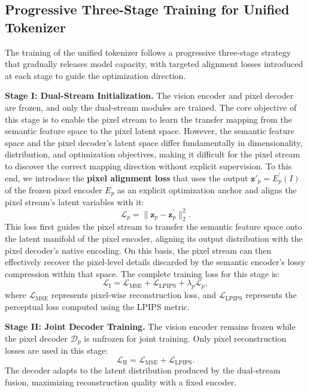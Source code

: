 \documentclass[runningheads]{llncs}
\begin{document}
\subsection{Progressive Three-Stage Training for Unified Tokenizer}

The training of the unified tokenizer follows a progressive three-stage strategy that gradually releases model capacity, with targeted alignment losses introduced at each stage to guide the optimization direction.

\noindent\textbf{Stage I: Dual-Stream Initialization.}
The vision encoder and pixel decoder are frozen, and only the dual-stream modules are trained. The core objective of this stage is to enable the pixel stream to learn the transfer mapping from the semantic feature space to the pixel latent space. However, the semantic feature space and the pixel decoder's latent space differ fundamentally in dimensionality, distribution, and optimization objectives, making it difficult for the pixel stream to discover the correct mapping direction without explicit supervision. To this end, we introduce the \textbf{pixel alignment loss} that uses the output $\mathbf{z}'_p = E^{'}_p(I)$ of the frozen pixel encoder $E_p$ as an explicit optimization anchor and aligns the pixel stream's latent variables with it:
$$\mathcal{L}_{p} = \| \mathbf{z}_{p} - \mathbf{z}_p^{'} \|_2^2.$$
This loss first guides the pixel stream to transfer the semantic feature space onto the latent manifold of the pixel encoder, aligning its output distribution with the pixel decoder's native encoding. On this basis, the pixel stream can then effectively recover the pixel-level details discarded by the semantic encoder's lossy compression within that space. The complete training loss for this stage is:
$$\mathcal{L}_{\text{I}} = \mathcal{L}_{\text{MSE}} + \mathcal{L}_{\text{LPIPS}} + \lambda_p \mathcal{L}_{p},$$
where $\mathcal{L}_{\text{MSE}}$ represents pixel-wise reconstruction loss, and $\mathcal{L}_{\text{LPIPS}}$ represents the perceptual loss
computed using the LPIPS metric.

\noindent\textbf{Stage II: Joint Decoder Training.} The vision encoder remains frozen while the pixel decoder $\mathcal{D}_p$ is unfrozen for joint training. Only pixel reconstruction losses are used in this stage:
$$\mathcal{L}_{\text{II}} = \mathcal{L}_{\text{MSE}} + \mathcal{L}_{\text{LPIPS}}.$$
The decoder adapts to the latent distribution produced by the dual-stream fusion, maximizing reconstruction quality with a fixed encoder.
\end{document}
